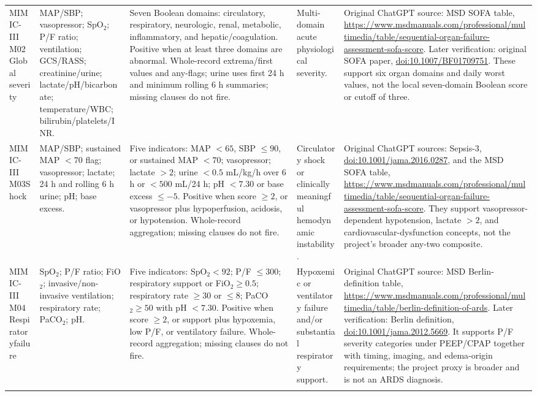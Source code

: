 \documentclass[letterpaper,10pt]{article}
\begin{document}
\begin{landscape}
\begin{longtable}{@{}L{0.88in}L{1.72in}L{2.32in}L{1.05in}L{2.82in}@{}}
MIMIC-III M02\newline Global severity &
MAP/SBP; vasopressor; SpO$_2$; P/F ratio; ventilation; GCS/RASS;
creatinine/urine; lactate/pH/bicarbonate; temperature/WBC;
bilirubin/platelets/INR. &
Seven Boolean domains: circulatory, respiratory, neurologic, renal, metabolic,
inflammatory, and hepatic/coagulation. Positive when at least three domains are
abnormal. Whole-record extrema/first values and any-flags; urine uses first
24 h and minimum rolling 6 h summaries; missing clauses do not fire. &
Multi-domain acute physiological severity. &
Original ChatGPT source: MSD SOFA table,
\url{https://www.msdmanuals.com/professional/multimedia/table/sequential-organ-failure-assessment-sofa-score}.
Later verification: original SOFA paper,
\href{https://doi.org/10.1007/BF01709751}{doi:10.1007/BF01709751}.
These support six organ domains and daily worst values, not the local
seven-domain Boolean score or cutoff of three. \\
\addlinespace

MIMIC-III M03\newline Shock &
MAP/SBP; sustained MAP $<70$ flag; vasopressor; lactate; 24 h and rolling
6 h urine; pH; base excess. &
Five indicators: MAP $<65$, SBP $\leq90$, or sustained MAP $<70$;
vasopressor; lactate $>2$; urine $<0.5$ mL/kg/h over 6 h or
$<500$ mL/24 h; pH $<7.30$ or base excess $\leq-5$. Positive when score
$\geq2$, or vasopressor plus hypoperfusion, acidosis, or hypotension.
Whole-record aggregation; missing clauses do not fire. &
Circulatory shock or clinically meaningful hemodynamic instability. &
Original ChatGPT sources: Sepsis-3,
\href{https://doi.org/10.1001/jama.2016.0287}
{doi:10.1001/jama.2016.0287}, and the MSD SOFA table,
\url{https://www.msdmanuals.com/professional/multimedia/table/sequential-organ-failure-assessment-sofa-score}.
They support vasopressor-dependent hypotension, lactate $>2$, and
cardiovascular-dysfunction concepts, not the project's broader any-two
composite. \\
\addlinespace

MIMIC-III M04\newline Respiratory\newline failure &
SpO$_2$; P/F ratio; FiO$_2$; invasive/non-invasive ventilation; respiratory
rate; PaCO$_2$; pH. &
Five indicators: SpO$_2<92$; P/F $\leq300$; respiratory support or
FiO$_2\geq0.5$; respiratory rate $\geq30$ or $\leq8$;
PaCO$_2\geq50$ with pH $<7.30$. Positive when score $\geq2$, or support
plus hypoxemia, low P/F, or ventilatory failure. Whole-record aggregation;
missing clauses do not fire. &
Hypoxemic or ventilatory failure and/or substantial respiratory support. &
Original ChatGPT source: MSD Berlin-definition table,
\url{https://www.msdmanuals.com/professional/multimedia/table/berlin-definition-of-ards}.
Later verification: Berlin definition,
\href{https://doi.org/10.1001/jama.2012.5669}
{doi:10.1001/jama.2012.5669}. It supports P/F severity categories under
PEEP/CPAP together with timing, imaging, and edema-origin requirements; the
project proxy is broader and is not an ARDS diagnosis. \\
\addlinespace


\end{longtable}
\end{landscape}
\end{document}
